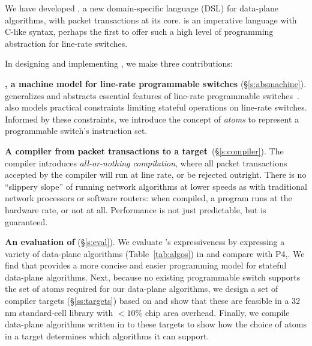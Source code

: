 We have developed {\em \pktlanguage{}}, a new domain-specific language
(DSL) for data-plane algorithms, with packet transactions at its core.
\pktlanguage is an imperative language with C-like syntax, perhaps the
first to offer such a high level of programming abstraction for
line-rate switches.



In designing and implementing \pktlanguage, we make three contributions:
\begin{CompactEnumerate}
\item \textbf{\absmachine, a machine model for line-rate programmable
    switches} (\S\ref{s:absmachine}).  \absmachine generalizes and
  abstracts essential features of line-rate programmable
  switches~\cite{rmt, xpliant, flexpipe}. \absmachine also models
  practical constraints limiting stateful operations on line-rate
  switches.  Informed by these constraints, we introduce the concept
  of {\em atoms} to represent a programmable switch's instruction set.

\item \textbf{A compiler from \pktlanguage packet transactions to a
    \absmachine target}~(\S\ref{s:compiler}). The \pktlanguage
  compiler introduces \textit{all-or-nothing compilation}, where all
  packet transactions accepted by the compiler will run at line rate,
  or be rejected outright. There is no ``slippery slope'' of running
  network algorithms at lower speeds as with traditional network
  processors or software routers: when compiled, a \pktlanguage
  program runs at the hardware rate, or not at all. Performance is not
  just predictable, but is guaranteed.


\item \textbf{An evaluation of \pktlanguage} (\S\ref{s:eval}). We evaluate
  \pktlanguage's expressiveness by expressing a variety of data-plane
  algorithms (Table~\ref{tab:algos}) in \pktlanguage and compare with
  P4,. We find that \pktlanguage provides a more concise and easier
  programming model for stateful data-plane algorithms.  Next, because
  no existing programmable switch supports the set of atoms required
  for our data-plane algorithms, we design a set of compiler targets
  (\S\ref{ss:targets}) based on \absmachine and show that these are
  feasible in a 32 nm standard-cell library with $< 10\%$ chip area
  overhead.  Finally, we compile data-plane algorithms written in
  \pktlanguage to these targets to show how the choice of atoms in a
  target determines which algorithms it can support.
\end{CompactEnumerate}

